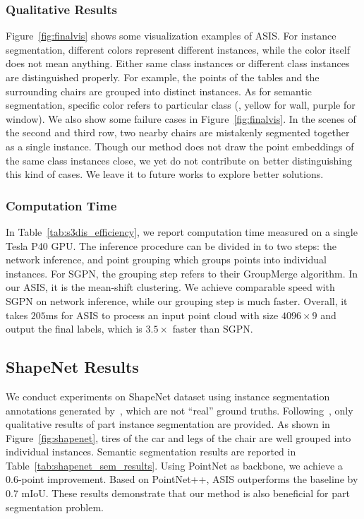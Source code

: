 \documentclass[10pt,twocolumn,letterpaper]{article}
\begin{document}
\vspace{-0.2cm}
\subsubsection{Qualitative Results}
Figure~\ref{fig:finalvis} shows some visualization examples of ASIS.
For instance segmentation, different colors represent different instances, while the color itself does not mean anything.
Either same class instances or different class instances are distinguished properly.
For example, the points of the tables and the surrounding chairs are grouped into distinct instances. 
As for semantic segmentation, specific color refers to particular class (\eg, yellow for wall, purple for window).
We also show some failure cases in Figure~\ref{fig:finalvis}.
In the scenes of the second and third row, two nearby chairs are mistakenly segmented together as a single instance.
Though our method does not draw the point embeddings of the same class instances close, we yet do not contribute on better distinguishing this kind of cases.  
We leave it to future works to explore better solutions.


\vspace{-0.2cm}
\subsubsection{Computation Time}
In Table~\ref{tab:s3dis_efficiency}, we report computation time  measured on a single Tesla P40 GPU. 
The inference procedure can be divided in to two steps: the network inference, and point grouping which groups points into individual instances.
For SGPN, the grouping step refers to their GroupMerge algorithm. 
In our ASIS, it is the mean-shift clustering.
We achieve comparable speed with SGPN on network inference, while our grouping step is much faster.
Overall, it takes $205$ms for ASIS to process an input point cloud with size $4096\times9$ and output the final labels, which is $3.5\times$ faster than SGPN.







\subsection{ShapeNet Results}
We conduct experiments on ShapeNet dataset using instance segmentation annotations generated by~\cite{sgpn}, which are not ``real'' ground truths. 
Following~\cite{sgpn}, only qualitative results of part instance segmentation are provided.
As shown in Figure~\ref{fig:shapenet}, tires of the car and legs of the chair are well grouped into individual instances.
Semantic segmentation results are reported in Table~\ref{tab:shapenet_sem_results}.
Using PointNet as backbone, we achieve a 0.6-point improvement.
Based on PointNet++, ASIS outperforms the baseline by 0.7 mIoU. 
These results demonstrate that our method is also beneficial for part segmentation problem.
\end{document}
